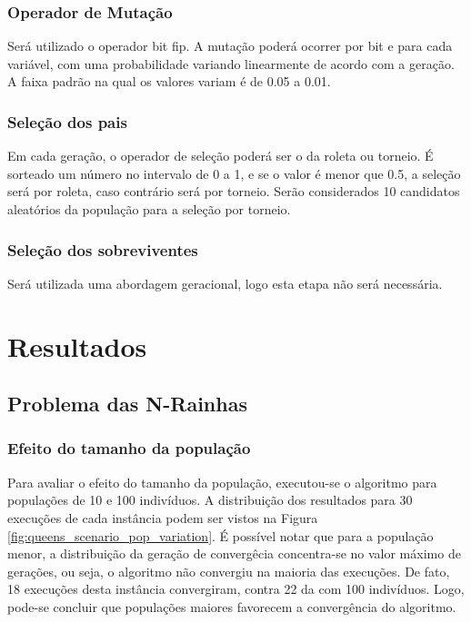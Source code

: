 \documentclass[conference]{IEEEtran}
\begin{document}
\subsubsection{{Operador de Mutação}}
Será utilizado o operador bit fip. A mutação poderá ocorrer por bit e para cada variável, com uma probabilidade variando linearmente de acordo com a geração. A faixa padrão na qual os valores variam é de 0.05 a 0.01.

\subsubsection{{Seleção dos pais}}
Em cada geração, o operador de seleção poderá ser o da roleta ou torneio. É sorteado um número no intervalo de 0 a 1, e se o valor é menor que 0.5, a seleção será por roleta, caso contrário será por torneio. Serão considerados 10 candidatos aleatórios da população para a seleção por torneio. 

\subsubsection{{Seleção dos sobreviventes}}
Será utilizada uma abordagem geracional, logo esta etapa não será necessária.


\section{Resultados}

\subsection{Problema das N-Rainhas}

\subsubsection{Efeito do tamanho da população}

Para avaliar o efeito do tamanho da população, executou-se o algoritmo para populações de 10 e 100 indivíduos. A distribuição dos resultados para 30 execuções de cada instância podem ser vistos na Figura \ref{fig:queens_scenario_pop_variation}. É possível notar que para a população menor, a distribuição da geração de convergêcia concentra-se no valor máximo de gerações, ou seja, o algoritmo não convergiu na maioria das execuções. De fato, 18 execuções desta instância convergiram, contra 22 da com 100 indivíduos. Logo, pode-se concluir que populações maiores favorecem a convergência do algoritmo. 
\end{document}
